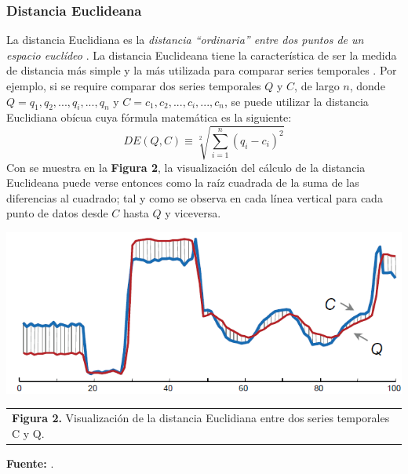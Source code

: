 \subsubsection{\textbf{Distancia Euclideana}}
La distancia Euclidiana es la \textit{distancia \enquote{ordinaria} entre dos puntos de un espacio eucl\'ideo} \cite{euclidean}. 
La distancia Euclideana tiene la caracter\'istica de ser la medida de distancia m\'as simple y la m\'as utilizada para comparar series temporales \cite{motifs}. Por ejemplo, si se require comparar dos series temporales $Q$ y $C$, de largo $n$, donde\\ $Q = q_1, q_2, ..., q_i, ..., q_n$ y $C = c_1, c_2, ..., c_i, ..., c_n$, se puede utilizar la distancia Euclidiana ob\'icua cuya f\'ormula matem\'atica es la siguiente: 
\begin{equation}
DE(Q, C) \equiv \sqrt[2]{\sum\limits_{i=1}^{n}{(q_i - c_i)}^2}
\end{equation}
Con se muestra en la \textbf{Figura 2}, la visualizaci\'on del c\'alculo de la distancia Euclideana puede verse entonces como la ra\'iz cuadrada de la suma de las diferencias al cuadrado; tal y como se observa en cada l\'inea vertical para cada punto de datos desde $C$ hasta $Q$ y viceversa.
\begin{center}
\includegraphics[scale=0.7]{euclidean.png}\\
\vspace*{10pt}
\begin{tabular}{l}
\footnotesize{\textbf{Figura 2.} Visualizaci\'on de la distancia Euclidiana entre dos series temporales C y Q.}\\ 
\end{tabular}{}
\textbf{Fuente:} \cite{euclidean}.
\end{center}
